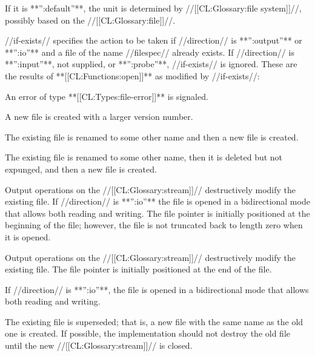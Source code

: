 If it is **'':default''**, the unit is determined by //[[CL:Glossary:file system]]//, possibly based on the //[[CL:Glossary:file]]//.


//if-exists// specifies the action to be taken if //direction// is **'':output''** or **'':io''** and a file of the name //filespec// already exists. If //direction// is **'':input''**, not supplied, or **'':probe''**, //if-exists// is ignored. These are the results of **[[CL:Functions:open]]** as modified by //if-exists//:

\beginlist


An error of type **[[CL:Types:file-error]]** is signaled.


A new file is created with a larger version number.


The existing file is renamed to some other name and then a new file is created.


The existing file is renamed to some other name, then it is deleted but not expunged, and then a new file is created.


Output operations on the //[[CL:Glossary:stream]]// destructively modify the existing file. If //direction// is **'':io''** the file is opened in a bidirectional mode that allows both reading and writing. The file pointer is initially positioned at the beginning of the file; however, the file is not truncated back to length zero when it is opened.


Output operations on the //[[CL:Glossary:stream]]// destructively modify the existing file. The file pointer is initially positioned at the end of the file.

If //direction// is **'':io''**, the file is opened in a bidirectional mode that allows both reading and writing.


The existing file is superseded; that is, a new file with the same name as the old one is created. If possible, the implementation should not destroy the old file until the new //[[CL:Glossary:stream]]// is closed.

